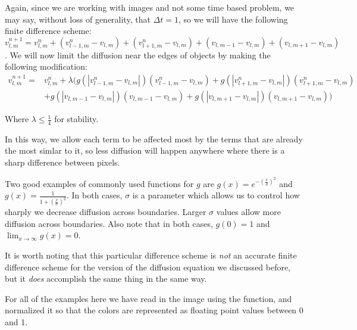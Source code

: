 Again, since we are working with images and not some time based problem, we may say, without loss of generality, that $\Delta t = 1$, so we will have the following finite difference scheme:
$$v_{l,m}^{n+1} = v_{l,m}^n + (v_{l-1,m}^n - v_{l,m}) + (v_{l+1,m}^n - v_{l,m}) + (v_{l,m-1} - v_{l,m}) + (v_{l,m+1} - v_{l,m})$$.
We will now limit the diffusion near the edges of objects by making the following modification:
\begin{equation*}
\begin{split}
v_{l,m}^{n+1} =& v_{l,m}^n + \lambda (g(|v_{l-1,m}^n - v_{l,m}|)(v_{l-1,m}^n - v_{l,m}) + g(|v_{l+1,m}^n - v_{l,m}|)(v_{l+1,m}^n - v_{l,m}) \\
 &+ g(|v_{l,m-1} - v_{l,m}|)(v_{l,m-1} - v_{l,m}) + g(|v_{l,m+1} - v_{l,m}|)(v_{l,m+1} - v_{l,m}))
\end{split}
\end{equation*}

Where $\lambda \leq \frac{1}{4}$ for stability.

In this way, we allow each term to be affected most by the terms that are already the most simlar to it, so less diffusion will happen anywhere where there is a sharp difference between pixels.

Two good examples of commonly used functions for $g$ are $g(x) = e^{-\left(\frac{x}{\sigma}\right)^2}$ and $g(x) = \frac{1}{1+\left(\frac{x}{\sigma}\right)^2}$. 
In both cases, $\sigma$ is a parameter which allows us to control how sharply we decrease diffusion across boundaries.
Larger $\sigma$ values allow more diffusion across boundaries.
Also note that in both cases, $g(0) = 1$ and $\displaystyle{\lim_{x\to \infty} g(x) = 0}$.

It is worth noting that this particular difference scheme is \textit{not} an accurate finite difference scheme for the version of the diffusion equation we discussed before, but it \textit{does} accomplish the same thing in the same way.

For all of the examples here we have read in the image using the  function, and normalized it so that the colors are represented as floating point values between 0 and 1.


